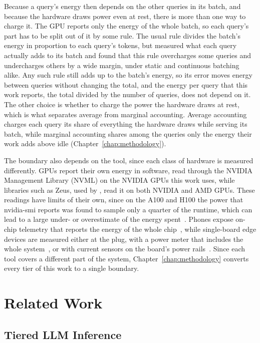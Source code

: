 \documentclass[cic,dipl,english]{infufrgs}
\begin{document}
Because a query's energy then depends on the other queries in its batch, and because the
hardware draws power even at rest, there is more than one way to charge it. The GPU reports
only the energy of the whole batch, so each query's part has to be split out of it by some
rule. The usual rule divides the batch's energy in proportion to each query's tokens, but
 measured what each query actually adds to its batch and found
that this rule overcharges some queries and undercharges others by a wide margin, under
static and continuous batching alike. Any such rule still adds up to the batch's energy, so
its error moves energy between queries without changing the total, and the energy per query
that this work reports, the total divided by the number of queries, does not depend on it.
The other choice is whether to charge the power the hardware draws at rest, which is what
separates average from marginal accounting. Average accounting charges each query its share
of everything the hardware draws while serving its batch, while marginal accounting shares
among the queries only the energy their work adds above idle
(Chapter~\ref{chap:methodology}).

The boundary also depends on the tool, since each class of hardware is measured
differently. GPUs report their own energy in software, read through the NVIDIA
Management Library (NVML) on the NVIDIA GPUs this work uses, while libraries such as
Zeus, used by , read it on both NVIDIA and AMD GPUs.
These readings have limits of their own, since on the A100 and H100 the power that
nvidia-smi reports was found to sample only a quarter of the runtime, which can lead to a large
under- or overestimate of the energy spent~\cite{yang2023part}. Phones expose on-chip
telemetry that reports the energy of the whole chip~\cite{cai2026npu}, while single-board
edge devices are measured either at the plug, with a power meter that includes the whole
system~\cite{renney2026cloud}, or with current sensors on the board's power
rails~\cite{tummalapalli2026edge}. Since each tool covers a different part of the
system, Chapter~\ref{chap:methodology} converts every tier of this work to a single
boundary.

\section{Related Work}
\label{sec:related}

\subsection{Tiered LLM Inference}
\label{sec:tiered}
\end{document}
